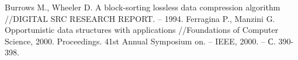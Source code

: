 \documentclass[letterpaper, 11pt]{article}
\begin{document}
\begingroup
\renewcommand{\section}[2]{}%
\begin{thebibliography}{7}
Burrows M., Wheeler D. A block-sorting lossless data compression algorithm //DIGITAL SRC RESEARCH REPORT. – 1994.
Ferragina P., Manzini G. Opportunistic data structures with applications //Foundations of Computer Science, 2000. Proceedings. 41st Annual Symposium on. – IEEE, 2000. – С. 390-398.

\end{thebibliography}
\endgroup
\end{document}
